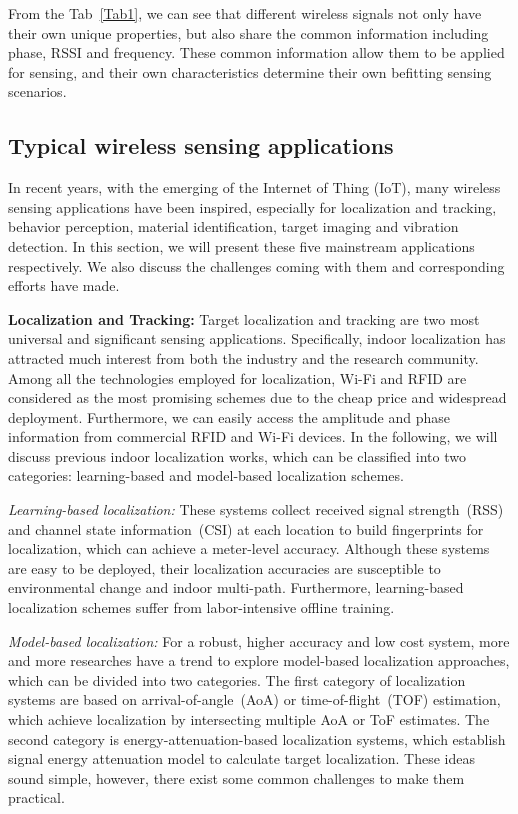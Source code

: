 From the Tab~\ref{Tab1}, we can see that different wireless signals not only have their own unique properties, but also share the common information including phase, RSSI and frequency. These common information allow them to be applied for sensing, and their own characteristics determine their own befitting sensing scenarios.


\subsection{Typical wireless sensing applications}
In recent years, with the emerging of the Internet of Thing (IoT), many wireless sensing applications have been inspired, especially for localization and tracking, behavior perception, material identification, target imaging and vibration detection. In this section, we will present these five mainstream applications respectively. We also discuss the challenges coming with them and corresponding efforts have made.

\textbf{Localization and Tracking:} Target localization and tracking are two most universal and significant sensing applications. Specifically, indoor localization has attracted much interest from both the industry and the research community. Among all the technologies employed for localization, Wi-Fi and RFID are considered as the most promising schemes due to the cheap price and widespread deployment. Furthermore, we can easily access the amplitude and phase information from commercial RFID and Wi-Fi devices. In the following, we will discuss previous indoor localization works, which can be classified into two categories: learning-based and model-based localization schemes.

\emph{Learning-based localization:} These systems collect received signal strength~(RSS) and channel state information~(CSI) at each location to build fingerprints for localization, which can achieve a meter-level accuracy. Although these systems are easy to be deployed, their localization accuracies are susceptible to environmental change and indoor multi-path. Furthermore, learning-based localization schemes suffer from labor-intensive offline training.

\emph{Model-based localization:} For a robust, higher accuracy and low cost system, more and more researches have a trend to explore model-based localization approaches, which can be divided into two categories. The first category of localization systems are based on arrival-of-angle~(AoA) or time-of-flight~(TOF) estimation, which achieve localization by intersecting multiple AoA or ToF estimates. The second category is energy-attenuation-based localization systems, which establish signal energy attenuation model to calculate target localization. These ideas sound simple, however, there exist some common challenges to make them practical.

